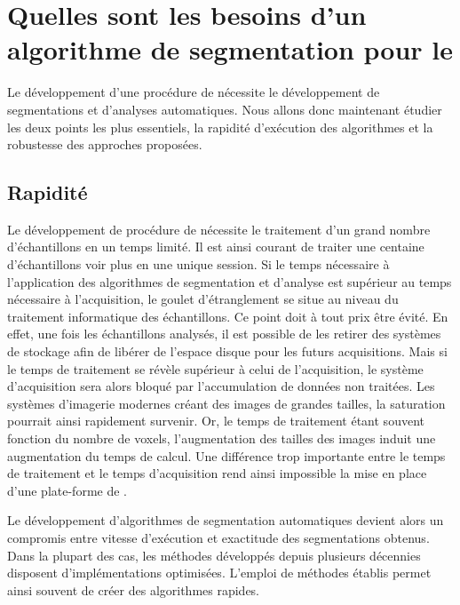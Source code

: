 \documentclass[\main/main.tex]{subfiles}
\begin{document}
            
\section{Quelles sont les besoins d'un algorithme de segmentation pour le \hcs{}}

%
Le développement d'une procédure de \hcs{} nécessite le développement de segmentations et d'analyses automatiques.
%
Nous allons donc maintenant étudier les deux points les plus essentiels,
la rapidité d'exécution des algorithmes et la robustesse des approches proposées.

    \subsection{Rapidité}
    
%
Le développement de procédure de \hcs{} nécessite le traitement d'un grand nombre d'échantillons en un temps limité.
%
Il est ainsi courant de traiter une centaine d'échantillons voir plus en une unique session.
%
Si le temps nécessaire à l'application des algorithmes de segmentation et d'analyse est supérieur au temps nécessaire à l'acquisition,
le goulet d'étranglement se situe au niveau du traitement informatique des échantillons.
%
Ce point doit à tout prix être évité. En effet, une fois les échantillons analysés, il est possible de les retirer des systèmes de stockage afin de libérer de l'espace disque pour les futurs acquisitions. Mais si le temps de traitement se révèle supérieur à celui de l'acquisition, le système d'acquisition sera alors bloqué par l'accumulation de données non traitées.
%
Les systèmes d'imagerie modernes créant des images de grandes tailles, la saturation pourrait ainsi rapidement survenir.
%
Or, le temps de traitement étant souvent fonction du nombre de voxels, l'augmentation des tailles des images induit une augmentation du temps de calcul.
%
Une différence trop importante entre le temps de traitement et le temps d'acquisition rend ainsi impossible la mise en place d'une plate-forme de \hcs{}.

%
Le développement d'algorithmes de segmentation automatiques devient alors un compromis entre vitesse d'exécution et exactitude des segmentations obtenus.
%
Dans la plupart des cas, les méthodes développés depuis plusieurs décennies disposent d'implémentations optimisées\cite{vandroogenbroeck_1996,perreault_2007,trieu_2007}.
%
L'emploi de méthodes établis permet ainsi souvent de créer des algorithmes rapides.
\end{document}
